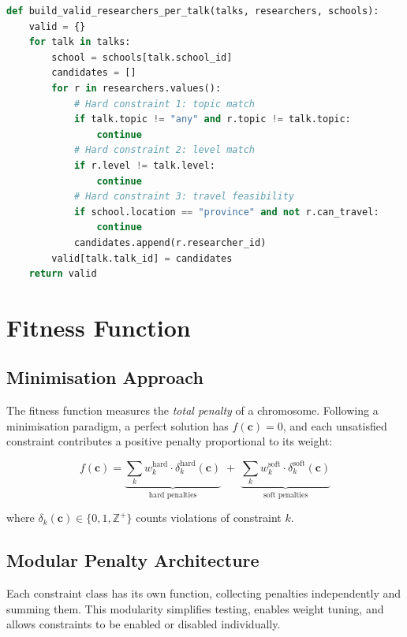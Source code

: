 \documentclass[12pt, a4paper]{article}
\begin{document}
\begin{lstlisting}[language=Python, caption={Preprocessing: building the valid researchers dictionary}]
def build_valid_researchers_per_talk(talks, researchers, schools):
    valid = {}
    for talk in talks:
        school = schools[talk.school_id]
        candidates = []
        for r in researchers.values():
            # Hard constraint 1: topic match
            if talk.topic != "any" and r.topic != talk.topic:
                continue
            # Hard constraint 2: level match
            if r.level != talk.level:
                continue
            # Hard constraint 3: travel feasibility
            if school.location == "province" and not r.can_travel:
                continue
            candidates.append(r.researcher_id)
        valid[talk.talk_id] = candidates
    return valid
\end{lstlisting}

\section{Fitness Function}

\subsection{Minimisation Approach}

The fitness function measures the \emph{total penalty} of a chromosome. Following a
minimisation paradigm, a perfect solution has $f(\mathbf{c}) = 0$, and each
unsatisfied constraint contributes a positive penalty proportional to its weight:

\begin{equation}
  f(\mathbf{c}) = \underbrace{\sum_{k} w_k^{\text{hard}} \cdot \delta_k^{\text{hard}}(\mathbf{c})}_{\text{hard penalties}}
  \;+\;
  \underbrace{\sum_{k} w_k^{\text{soft}} \cdot \delta_k^{\text{soft}}(\mathbf{c})}_{\text{soft penalties}}
\end{equation}

where $\delta_k(\mathbf{c}) \in \{0,1,\mathbb{Z}^+\}$ counts violations of constraint $k$.

\subsection{Modular Penalty Architecture}

Each constraint class has its own function, collecting penalties independently and
summing them. This modularity simplifies testing, enables weight tuning, and allows
constraints to be enabled or disabled individually.
\end{document}

